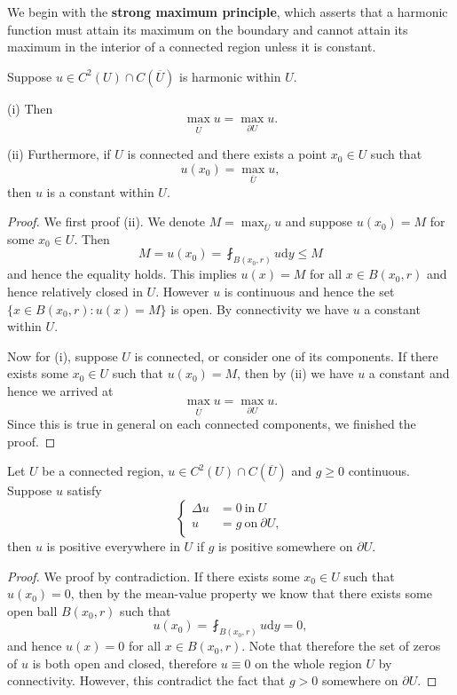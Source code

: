 We begin with the \textbf{strong maximum principle}, which asserts that a harmonic function must attain its maximum on the boundary and cannot attain its maximum in the interior of a connected region unless it is constant.
\begin{theorem}
Suppose $u\in C^2(U)\cap C(\overline{U})$ is harmonic within $U$.\par
(i) Then 
$$\max_{\overline{U}}u=\max_{\partial U}u.$$\par
(ii) Furthermore, if $U$ is connected and there exists a point $x_0\in U$ such that 
$$u(x_0)=\max_{\overline{U}}u,$$
then $u$ is a constant within $U$.
\end{theorem}
\begin{proof}
We first proof (ii). We denote $M=\max_{\overline{U}}u$ and suppose $u(x_0)=M$ for some $x_0\in U$. Then 
$$
M=u\left( x_0 \right) =\fint_{B\left( x_0,r \right)}{u\mathrm{d}y}\le M
$$
and hence the equality holds. This implies $u(x)=M$ for all $x\in B(x_0,r)$ and hence relatively closed in $U$. However $u$ is continuous and hence the set $\{x\in B(x_0,r):u(x)=M\}$ is open. By connectivity we have $u$ a constant within $U$.\par
Now for (i), suppose $U$ is connected, or consider one of its components. If there exists some $x_0\in U$ such that $u(x_0)=M$, then by (ii) we have $u$ a constant and hence we arrived at 
$$\max_{\overline{U}}u=\max_{\partial U}u.$$
Since this is true in general on each connected components, we finished the proof.
\end{proof}
\begin{proposition}
Let $U$ be a connected region, $u\in C^2(U)\cap C(\overline{U})$ and $g\ge 0$ continuous. Suppose $u$ satisfy 
\begin{equation}\label{1.10}
\left\{ \begin{aligned}
	\Delta u&=0\ \text{in}\ U\\
	u&=g\ \text{on}\ \partial U,\\
\end{aligned} \right. 
\end{equation}
then $u$ is positive everywhere in $U$ if $g$ is positive somewhere on $\partial U$.
\end{proposition}
\begin{proof}
We proof by contradiction. If there exists some $x_0\in U$ such that $u(x_0)=0$, then by the mean-value property we know that there exists some open ball $B(x_0,r)$ such that 
$$
u\left( x_0 \right) =\fint_{B\left( x_0,r \right)}{u\mathrm{d}y}=0,
$$
and hence $u(x)=0$ for all $x\in B(x_0,r)$. Note that therefore the set of zeros of $u$ is both open and closed, therefore $u\equiv 0$ on the whole region $U$ by connectivity. However, this contradict the fact that $g>0$ somewhere on $\partial U$.
\end{proof}
